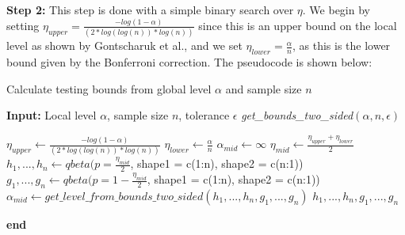 \documentclass[article]{jss}
\begin{document}
\newline
\newline
\textbf{Step 2:} This step is done with a simple binary search over $\eta$. We begin by setting $\eta_{upper} = \frac{-log(1 - \alpha)}{(2 * log(log(n)) * log(n))}$ since this is an upper bound on the local level as shown by Gontscharuk et al., and we set $\eta_{lower} = \frac{\alpha}{n}$, as this is the lower bound given by the Bonferroni correction. The pseudocode is shown below:
\begin{algorithm}[H]
\caption{Calculate testing bounds from global level $\alpha$ and sample size $n$}
\textbf{Input:} Local level $\alpha$, sample size $n$, tolerance $\epsilon$
\newline
\textit{get\_bounds\_two\_sided}$(\alpha, n, \epsilon)$
\begin{algorithmic}[1]
\STATE $\eta_{upper} \leftarrow \frac{-log(1 - \alpha)}{(2 * log(log(n)) * log(n))}$
\STATE $\eta_{lower} \leftarrow \frac{\alpha}{n}$
\STATE $\alpha_{mid} \leftarrow \infty$
\STATE $\eta_{mid} \leftarrow \frac{\eta_{upper} + \eta_{lower}}{2}$
\STATE $h_{1}, ..., h_{n} \leftarrow qbeta(p = \frac{\eta_{mid}}{2}$, shape1 = c(1:n), shape2 = c(n:1))
\STATE $g_{1}, ..., g_{n} \leftarrow qbeta(p = 1 - \frac{\eta_{mid}}{2}$, shape1 = c(1:n), shape2 = c(n:1))
\STATE $\alpha_{mid} \leftarrow get\_level\_from\_bounds\_two\_sided(h_{1}, ..., h_{n}, g_{1}, ..., g_{n})$
\ENDWHILE
\RETURN $h_{1}, ..., h_{n}, g_{1}, ..., g_{n}$
\end{algorithmic}
\textbf{end}
\end{algorithm}
\end{document}
